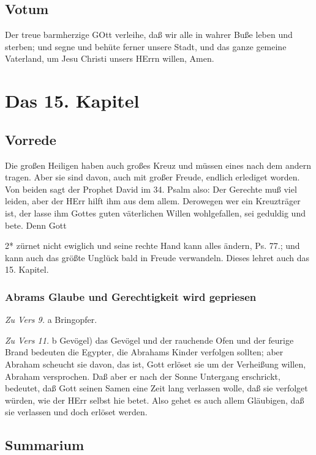 \section{Votum}

Der treue barmherzige GOtt verleihe, daß wir alle in wahrer Buße leben und sterben; und segne und behüte ferner unsere Stadt, und das ganze gemeine Vaterland, um Jesu Christi unsers HErrn willen, Amen.

\chapter{Das 15. Kapitel}

\section{Vorrede}

Die großen Heiligen haben auch großes Kreuz und müssen eines nach dem andern tragen. Aber sie sind davon, auch mit großer Freude, endlich erlediget worden. Von beiden sagt der Prophet David im 34. Psalm also: Der Gerechte muß viel leiden, aber der HErr hilft ihm aus dem allem. Derowegen wer ein Kreuzträger ist, der lasse ihm Gottes guten väterlichen Willen wohlgefallen, sei geduldig und bete. Denn Gott

2*
zürnet nicht ewiglich und seine rechte Hand kann alles ändern, Ps. 77.; und kann auch das größte Unglück bald in Freude verwandeln. Dieses lehret auch das 15. Kapitel.

\subsection{Abrams Glaube und Gerechtigkeit wird gepriesen}

\emph{Zu Vers 9.} a Bringopfer.

\emph{Zu Vers 11.} b Gevögel) das Gevögel und der rauchende Ofen und der feurige Brand bedeuten die Egypter, die Abrahams Kinder verfolgen sollten; aber Abraham scheucht sie davon, das ist, Gott erlöset sie um der Verheißung willen, Abraham versprochen. Daß aber er nach der Sonne Untergang erschrickt, bedeutet, daß Gott seinen Samen eine Zeit lang verlassen wolle, daß sie verfolget würden, wie der HErr selbst hie betet. Also gehet es auch allem Gläubigen, daß sie verlassen und doch erlöset werden.

\section{Summarium}

